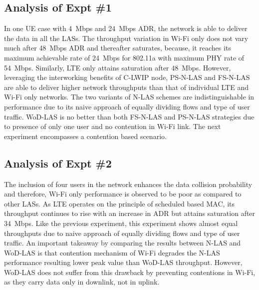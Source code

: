 \documentclass[conference]{IEEEtran}
\begin{document}
\subsection{Analysis of Expt \#1}In one UE case with 4~Mbps and 24~Mbps ADR, the network is able to deliver the data in all the LASs. The throughput variation in Wi-Fi only does not vary much after 48~Mbps ADR and thereafter saturates, because, it reaches its maximum achievable rate of 24~Mbps for 802.11a with maximum PHY rate of 54~Mbps. Similarly, LTE only attains saturation after 48~Mbps. However, leveraging the interworking benefits of C-LWIP node, PS-N-LAS and FS-N-LAS are able to deliver higher network throughputs than that of individual LTE and Wi-Fi only networks. The two variants of N-LAS schemes are indistinguishable in performance due to its naive approach of equally dividing flows and type of user traffic. WoD-LAS is no better than both FS-N-LAS and PS-N-LAS strategies due to presence of only one user and no contention in Wi-Fi link. The next experiment encompasses a contention based scenario. 

\subsection{Analysis of Expt \#2}The inclusion of four users in the network enhances the data collision probability and therefore, Wi-Fi only performance is observed to be poor as compared to other LASs. As LTE operates on the principle of scheduled based MAC, its throughput continues to rise with an increase in ADR but attains saturation after 34~Mbps. Like the previous experiment, this experiment shows almost equal throughputs due to naive approach of equally dividing flows and type of user traffic. 
An important takeaway by comparing the results between N-LAS and WoD-LAS is that contention mechanism of Wi-Fi degrades the N-LAS performance resulting lower peak value than WoD-LAS throughput. However, WoD-LAS does not suffer from this drawback by preventing contentions in Wi-Fi, as they carry data only in downlink, not in uplink.
\end{document}
